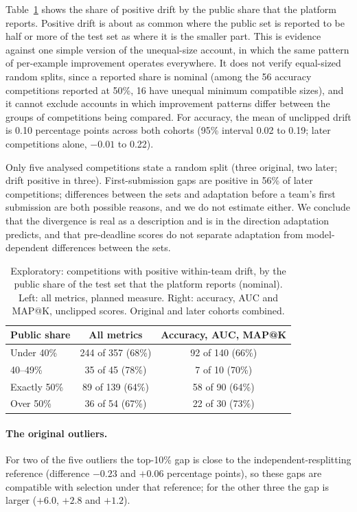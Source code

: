 \documentclass[10pt]{article}
\begin{document}
Table~\ref{tab:share} shows the share of positive drift by the public share that the platform reports. Positive drift is about as common where the public set is reported to be half or more of the test set as where it is the smaller part. This is evidence against one simple version of the unequal-size account, in which the same pattern of per-example improvement operates everywhere. It does not verify equal-sized random splits, since a reported share is nominal (among the 56 accuracy competitions reported at 50\%, 16 have unequal minimum compatible sizes), and it cannot exclude accounts in which improvement patterns differ between the groups of competitions being compared. For accuracy, the mean of unclipped drift is 0.10 percentage points across both cohorts (95\% interval 0.02 to 0.19; later competitions alone, $-0.01$ to 0.22).

Only five analysed competitions state a random split (three original, two later; drift positive in three). First-submission gaps are positive in 56\% of later competitions; differences between the sets and adaptation before a team's first submission are both possible reasons, and we do not estimate either. We conclude that the divergence is real as a description and is in the direction adaptation predicts, and that pre-deadline scores do not separate adaptation from model-dependent differences between the sets.

\begin{table}[t]
\caption{Exploratory: competitions with positive within-team drift, by the public share of the test set that the platform reports (nominal). Left: all metrics, planned measure. Right: accuracy, AUC and MAP@K, unclipped scores. Original and later cohorts combined.}
\label{tab:share}
\centering\small
\begin{tabular}{lcc}
\toprule
Public share & All metrics & Accuracy, AUC, MAP@K \\
\midrule
Under 40\% & 244 of 357 (68\%) & 92 of 140 (66\%) \\
40--49\% & 35 of 45 (78\%) & 7 of 10 (70\%) \\
Exactly 50\% & 89 of 139 (64\%) & 58 of 90 (64\%) \\
Over 50\% & 36 of 54 (67\%) & 22 of 30 (73\%) \\
\bottomrule
\end{tabular}
\end{table}

\paragraph{The original outliers.} For two of the five outliers the top-10\% gap is close to the independent-resplitting reference (difference $-0.23$ and $+0.06$ percentage points), so these gaps are compatible with selection under that reference; for the other three the gap is larger ($+6.0$, $+2.8$ and $+1.2$).
\end{document}
